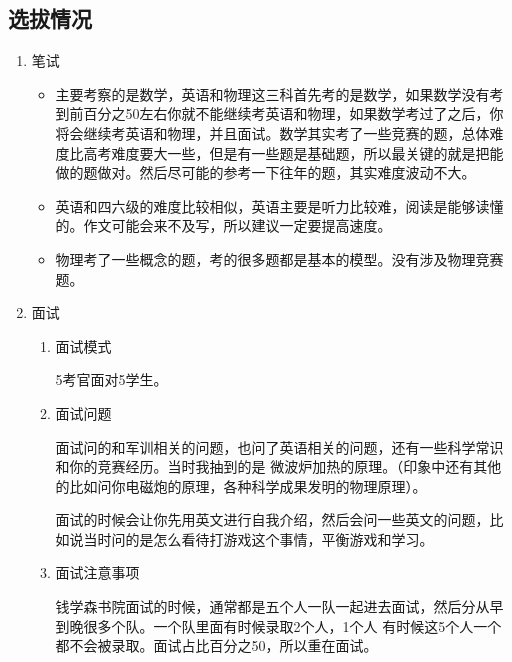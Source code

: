 \documentclass[zihao=-4,fontset=none]{Beautybook-CN}
\begin{document}
\subsection{选拔情况} 
\begin{enumerate}
	\item 笔试
	      \begin{itemize}
	      	\item 主要考察的是数学，英语和物理这三科首先考的是数学，如果数学没有考到前百分之50左右你就不能继续考英语和物理，如果数学考过了之后，你将会继续考英语和物理，并且面试。数学其实考了一些竞赛的题，总体难度比高考难度要大一些，但是有一些题是基础题，所以最关键的就是把能做的题做对。然后尽可能的参考一下往年的题，其实难度波动不大。
	      	      
	      	\item 英语和四六级的难度比较相似，英语主要是听力比较难，阅读是能够读懂的。作文可能会来不及写，所以建议一定要提高速度。
	      	      
	      	\item 物理考了一些概念的题，考的很多题都是基本的模型。没有涉及物理竞赛题。
	      \end{itemize}     
	             
	\item 面试
	      \begin{enumerate}
	      	\item 面试模式
	      	      	      	      	      	          
	      	      5考官面对5学生。
	      	      	      	      	      	          
	      	\item 面试问题
	      	      	      	      	      	          
	      	      面试问的和军训相关的问题，也问了英语相关的问题，还有一些科学常识和你的竞赛经历。当时我抽到的是 微波炉加热的原理。（印象中还有其他的比如问你电磁炮的原理，各种科学成果发明的物理原理）。
	      	      
	      	      面试的时候会让你先用英文进行自我介绍，然后会问一些英文的问题，比如说当时问的是怎么看待打游戏这个事情，平衡游戏和学习。
	      	      	      	      	      	          
	      	\item 面试注意事项
	      	      	      	      
	      	      钱学森书院面试的时候，通常都是五个人一队一起进去面试，然后分从早到晚很多个队。一个队里面有时候录取2个人，1个人 有时候这5个人一个都不会被录取。面试占比百分之50，所以重在面试。
	      	                    

\end{enumerate}
\end{enumerate}
\end{document}
